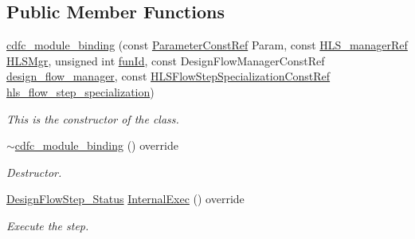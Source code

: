 \subsection*{Public Member Functions}
\begin{DoxyCompactItemize}
\item 
\hyperlink{classcdfc__module__binding_a045314febf16ce516460eb318641bfda}{cdfc\+\_\+module\+\_\+binding} (const \hyperlink{Parameter_8hpp_a37841774a6fcb479b597fdf8955eb4ea}{Parameter\+Const\+Ref} Param, const \hyperlink{hls__manager_8hpp_acd3842b8589fe52c08fc0b2fcc813bfe}{H\+L\+S\+\_\+manager\+Ref} \hyperlink{classHLS__step_ade85003a99d34134418451ddc46a18e9}{H\+L\+S\+Mgr}, unsigned int \hyperlink{classHLSFunctionStep_a3e6434fd86c698b0c70520b859bff5b0}{fun\+Id}, const Design\+Flow\+Manager\+Const\+Ref \hyperlink{classDesignFlowStep_ab770677ddf087613add30024e16a5554}{design\+\_\+flow\+\_\+manager}, const \hyperlink{hls__step_8hpp_a5fdd2edf290c196531d21d68e13f0e74}{H\+L\+S\+Flow\+Step\+Specialization\+Const\+Ref} \hyperlink{classHLS__step_a843be75ba53b81876aa3c8b870ae8a55}{hls\+\_\+flow\+\_\+step\+\_\+specialization})
\begin{DoxyCompactList}\small\item\em This is the constructor of the class. \end{DoxyCompactList}\item 
\hyperlink{classcdfc__module__binding_aa0fe288f9870d0e64dfe379618ad6855}{$\sim$cdfc\+\_\+module\+\_\+binding} () override
\begin{DoxyCompactList}\small\item\em Destructor. \end{DoxyCompactList}\item 
\hyperlink{design__flow__step_8hpp_afb1f0d73069c26076b8d31dbc8ebecdf}{Design\+Flow\+Step\+\_\+\+Status} \hyperlink{classcdfc__module__binding_a4cb7a3249964fc7ebfb3cf33361d2cb2}{Internal\+Exec} () override
\begin{DoxyCompactList}\small\item\em Execute the step. \end{DoxyCompactList}\end{DoxyCompactItemize}
